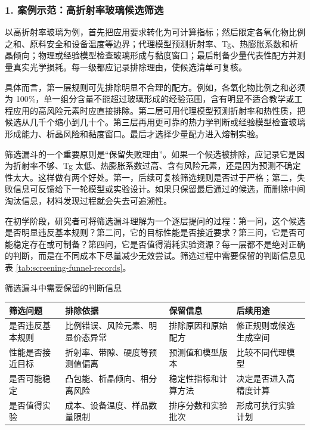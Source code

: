 \subsubsection*{\textbf{1. 案例示范：高折射率玻璃候选筛选}}

以高折射率玻璃为例，首先把应用要求转化为可计算指标；然后限定各氧化物比例之和、原料安全和设备温度等边界；代理模型预测折射率、Tg、热膨胀系数和析晶倾向；物理或经验模型检查玻璃形成与黏度窗口；最后制备少量代表性配方并测量真实光学损耗。每一级都应记录排除理由，使候选清单可复核。

具体而言，第一层规则可先排除明显不合理的配方。例如，各氧化物比例之和必须为 100\%，单一组分含量不能超过玻璃形成的经验范围，含有明显不适合教学或工程应用的高风险元素时应直接排除。第二层可用代理模型预测折射率和热性质，把候选从几千个缩小到几十个。第三层再用更可靠的热力学判断或经验模型检查玻璃形成能力、析晶风险和黏度窗口。最后才选择少量配方进入熔制实验。

筛选漏斗的一个重要原则是“保留失败理由”。如果一个候选被排除，应记录它是因为折射率不够、Tg 太低、热膨胀系数过高、含有风险元素，还是因为预测不确定性太大。这样做有两个好处。第一，后续可复核筛选规则是否过于严格；第二，失败信息可反馈给下一轮模型或实验设计。如果只保留最后通过的候选，而删除中间淘汰信息，材料发现过程就会失去可追溯性。

在初学阶段，研究者可将筛选漏斗理解为一个逐层提问的过程：第一问，这个候选是否明显违反基本规则？第二问，它的目标性能是否接近要求？第三问，它是否可能稳定存在或可制备？第四问，它是否值得消耗实验资源？每一层都不是绝对正确的判断，而是在不同成本下尽量减少无效尝试。筛选过程中需要保留的判断信息见表 \ref{tab:screening-funnel-records}。

\begin{formalTable}[htbp]
\caption{筛选漏斗中需要保留的判断信息}
\label{tab:screening-funnel-records}
\footnotesize
\begin{tabularx}{\textwidth}{@{}YYYY@{}}
\toprule
\textbf{筛选问题} & \textbf{排除依据} & \textbf{保留信息} & \textbf{后续用途} \\
\midrule
是否违反基本规则 & 比例错误、风险元素、明显价态异常 & 排除原因和原始配方 & 修正规则或候选生成空间 \\
性能是否接近目标 & 折射率、带隙、硬度等预测值偏离 & 预测值和模型版本 & 比较不同代理模型 \\
是否可能稳定 & 凸包能、析晶倾向、相分离风险 & 稳定性指标和计算方法 & 决定是否进入高精度计算 \\
是否值得实验 & 成本、设备温度、样品数量限制 & 排序分数和实验批次 & 形成可执行实验计划 \\
\bottomrule
\end{tabularx}
\end{formalTable}

